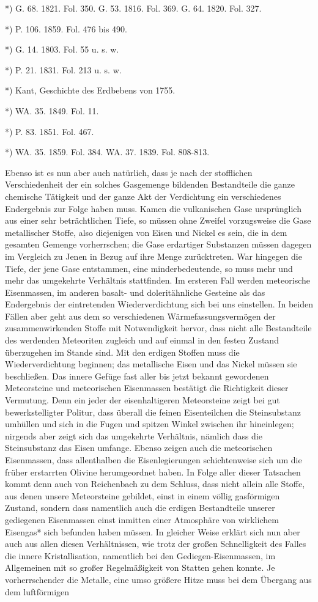 \documentclass[a4paper, 8pt, oneside, polutonikogreek, german]{article}
\begin{document}
*) G. 68. 1821. Fol. 350. G. 53. 1816. Fol. 369. G. 64. 1820. Fol. 327.

*) P. 106. 1859. Fol. 476 bis 490.

*) G. 14. 1803. Fol. 55 u. s. w.

*) P. 21. 1831. Fol. 213 u. s. w.

*) Kant, Geschichte des Erdbebens von 1755.

*) WA. 35. 1849. Fol. 11.

*) P. 83. 1851. Fol. 467.

*) WA. 35. 1859. Fol. 384. WA. 37. 1839. Fol. 808-813.

Ebenso ist es nun aber auch natürlich, dass je nach der stofflichen Verschiedenheit der ein solches Gasgemenge bildenden Bestandteile die ganze chemische Tätigkeit und der ganze Akt der Verdichtung ein verschiedenes Endergebnis zur Folge haben muss. Kamen die vulkanischen Gase ursprünglich aus einer sehr beträchtlichen Tiefe, so müssen ohne Zweifel vorzugsweise die Gase metallischer Stoffe, also diejenigen von Eisen und Nickel es sein, die in dem gesamten Gemenge vorherrschen; die Gase erdartiger Substanzen müssen dagegen im Vergleich zu Jenen in Bezug auf ihre Menge zurücktreten. War hingegen die Tiefe, der jene Gase entstammen, eine minderbedeutende, so muss mehr und mehr das umgekehrte Verhältnis stattfinden. Im ersteren Fall werden meteorische Eisenmassen, im anderen basalt- und doleritähnliche Gesteine als das Endergebnis der eintretenden Wiederverdichtung sich bei uns einstellen. In beiden Fällen aber geht aus dem so verschiedenen Wärmefassungsvermögen der zusammenwirkenden Stoffe mit Notwendigkeit hervor, dass nicht alle Bestandteile des werdenden Meteoriten zugleich und auf einmal in den festen Zustand überzugehen im Stande sind. Mit den erdigen Stoffen muss die Wiederverdichtung beginnen; das metallische Eisen und das Nickel müssen sie beschließen. Das innere Gefüge fast aller bis jetzt bekannt gewordenen Meteorsteine und meteorischen Eisenmassen bestätigt die Richtigkeit dieser Vermutung. Denn ein jeder der eisenhaltigeren Meteorsteine zeigt bei gut bewerkstelligter Politur, dass überall die feinen Eisenteilchen die Steinsubstanz umhüllen und sich in die Fugen und spitzen Winkel zwischen ihr hineinlegen; nirgends aber zeigt sich das umgekehrte Verhältnis, nämlich dass die Steinsubstanz das Eisen umfange. Ebenso zeigen auch die meteorischen Eisenmassen, dass allenthalben die Eisenlegierungen schichtenweise sich um die früher erstarrten Olivine herumgeordnet haben. In Folge aller dieser Tatsachen kommt denn auch von Reichenbach zu dem Schluss, dass nicht allein alle Stoffe, aus denen unsere Meteorsteine gebildet, einst in einem völlig gasförmigen Zustand, sondern dass namentlich auch die erdigen Bestandteile unserer gediegenen Eisenmassen einst inmitten einer Atmosphäre von wirklichem Eisengas* sich befunden haben müssen. In gleicher Weise erklärt sich nun aber auch aus allen diesen Verhältnissen, wie trotz der großen Schnelligkeit des Falles die innere Kristallisation, namentlich bei den Gediegen-Eisenmassen, im Allgemeinen mit so großer Regelmäßigkeit von Statten gehen konnte. Je vorherrschender die Metalle, eine umso größere Hitze muss bei dem Übergang aus dem luftförmigen 
\end{document}
